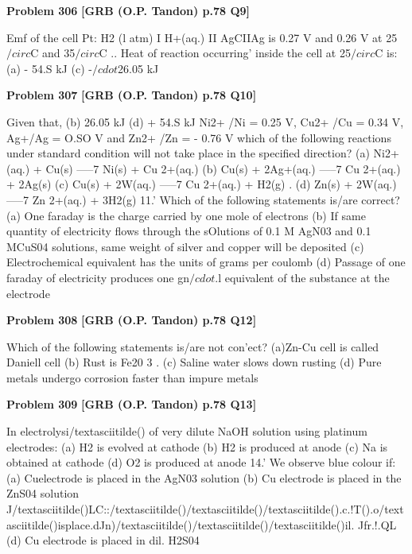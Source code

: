 \begin{problembox}
\textbf{Problem 306} \hfill \textbf{[GRB (O.P. Tandon) p.78 Q9]}
\label{q:ext-grb_all_questions-306}

Emf of the cell Pt: H2 (l atm) I H+(aq.) II AgCIIAg is 0.27 V 
and 0.26 V at 25$/circ$C and 35$/circ$C .. Heat of reaction occurring' 
inside the cell at 25$/circ$C is: 
(a) - 54.S kJ 
(c) -$/cdot$26.05 kJ
\end{problembox}

\begin{problembox}
\textbf{Problem 307} \hfill \textbf{[GRB (O.P. Tandon) p.78 Q10]}
\label{q:ext-grb_all_questions-307}

Given that, 
(b) 26.05 kJ 
(d) + 54.S kJ 
Ni2+ /Ni = 0.25 V, Cu2+ /Cu = 0.34 V, 
Ag+/Ag = O.SO V and Zn2+ /Zn = - 0.76 V 
which of the following reactions under standard condition will 
not take place in the specified direction? 
(a) Ni2+(aq.) + Cu(s) -----7 Ni(s) + Cu 2+(aq.) 
(b) Cu(s) + 2Ag+(aq.) -----7 Cu 2+(aq.) + 2Ag(s) 
(c) Cu(s) + 2W(aq.) -----7 Cu 2+(aq.) + H2(g) . 
(d) Zn(s) + 2W(aq.) -----7 Zn 2+(aq.) + 3H2(g) 
11.' Which of the following statements is/are correct? 
(a) One faraday is the charge carried by one mole of electrons 
(b) If same quantity of electricity flows through the sOlutions 
of 0.1 M AgN03 and 0.1 MCuS04 solutions, same weight 
of silver and copper will be deposited 
(c) Electrochemical equivalent has the units of grams per 
coulomb 
(d) Passage of one faraday of electricity produces one gn$/cdot$.l 
equivalent of the substance at the electrode
\end{problembox}

\begin{problembox}
\textbf{Problem 308} \hfill \textbf{[GRB (O.P. Tandon) p.78 Q12]}
\label{q:ext-grb_all_questions-308}

Which of the following statements is/are not con'ect? 
(a)Zn-Cu cell is called Daniell cell 
(b) Rust is Fe20 3 . 
(c) Saline water slows down rusting 
(d) Pure metals undergo corrosion faster than impure metals
\end{problembox}

\begin{problembox}
\textbf{Problem 309} \hfill \textbf{[GRB (O.P. Tandon) p.78 Q13]}
\label{q:ext-grb_all_questions-309}

In electrolysi/textasciitilde() of very dilute NaOH solution using platinum 
electrodes: 
(a) H2 is evolved at cathode 
(b) H2 is produced at anode 
(c) Na is obtained at cathode 
(d) O2 is produced at anode 
14.' We observe blue colour if: 
(a) Cuelectrode is placed in the AgN03 solution 
(b) Cu electrode is placed in the ZnS04 solution 
J/textasciitilde()LC::/textasciitilde()\underline{\hspace{1cm}}/textasciitilde()/textasciitilde().c.!T().o/textasciitilde()\underline{\hspace{1cm}}isplace.dJn)/textasciitilde()/textasciitilde()/textasciitilde()il. Jfr.!.QL \underline{\hspace{1cm}} \underline{\hspace{1cm}} 
(d) Cu electrode is placed in dil. H2S04
\end{problembox}

